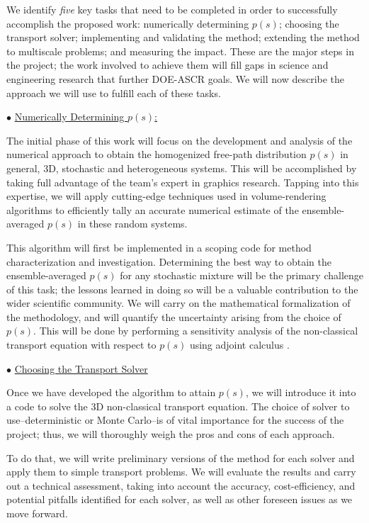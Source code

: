 \documentclass[12pt]{article}
\begin{document}
We identify \textit{five} key tasks that need to be completed in order to successfully accomplish the proposed work: numerically determining $p(s)$; choosing the transport solver; implementing and validating the method; extending the method to multiscale problems; and measuring the impact.
These are the major steps in the project; the work involved to achieve them will fill gaps in science and engineering research that further DOE-ASCR goals.
We will now describe the approach we will use to fulfill each of these tasks.

$\bullet$ \underline{Numerically Determining $p(s)$:}

The initial phase of this work will focus on the development and analysis of the numerical approach to obtain the homogenized free-path distribution $p(s)$ in general, 3D, stochastic and heterogeneous systems.
This will be accomplished by taking full advantage of the team's expert in graphics research.
Tapping into this expertise, we will apply cutting-edge techniques used in volume-rendering algorithms to efficiently tally an accurate numerical estimate of the ensemble-averaged $p(s)$ in these random systems.

This algorithm will first be implemented in a scoping code for method characterization and investigation.
Determining the best way to obtain the ensemble-averaged $p(s)$ for any stochastic mixture will be the primary challenge of this task; the lessons learned in doing so will be a valuable contribution to the wider scientific community.
We will carry on the mathematical formalization of the methodology, and will quantify the uncertainty arising from the choice of $p(s)$.
This will be done by performing a sensitivity analysis of the non-classical transport equation with respect to $p(s)$ using adjoint calculus \cite{barfra16,cac03}. 

$\bullet$ \underline{Choosing the Transport Solver}

Once we have developed the algorithm to attain $p(s)$, we will introduce it into a code to solve the 3D non-classical transport equation.
The choice of solver to use--deterministic or Monte Carlo--is of vital importance for the success of the project; thus, we will thoroughly weigh the pros and cons of each approach.

To do that, we will write preliminary versions of the method for each solver and apply them to simple transport problems.
We will evaluate the results and carry out a technical assessment, taking into account the accuracy, cost-efficiency, and potential pitfalls identified for each solver, as well as other foreseen issues as we move forward.
\end{document}

